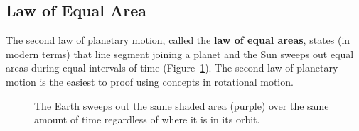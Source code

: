\subsection{Law of Equal Area}

The second law of planetary motion, called the \textbf{law of equal areas},
states (in modern terms) that line segment joining a planet and the Sun sweeps
out equal areas during equal intervals of time (Figure~\ref{kep2}). The second
law of planetary motion is the easiest to proof using concepts in rotational
motion.
\begin{figure}[!ht]
  \centering
    \caption{The Earth sweeps out the same shaded area (purple) over the
      same amount of time regardless of where it is in its orbit.}
    \label{kep2}
\end{figure}

